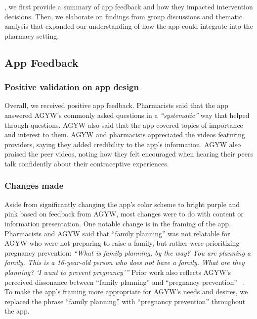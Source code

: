 , we first provide a summary of app feedback and how they impacted intervention decisions. Then, we elaborate on findings from group discussions and thematic analysis that expanded our understanding of how the  app could integrate into the pharmacy setting. 

\subsection{App Feedback}

\subsubsection{Positive validation on app design}

Overall, we received positive app feedback. Pharmacists said that the app answered AGYW’s commonly asked questions in a \textit{``systematic”} way that helped  through questions. AGYW also said that the app covered topics of importance and interest to them. AGYW and pharmacists appreciated the videos featuring providers, saying they added credibility to the app’s information. AGYW also praised the peer videos, noting how they felt encouraged when hearing their peers talk confidently about their contraceptive experiences. 

\subsubsection{Changes made}

Aside from significantly changing the app’s color scheme to bright purple and pink based on feedback from AGYW, most changes were to do with content or information presentation. One notable change is in the framing of the app. Pharmacists and AGYW said that ``family planning” was not relatable for AGYW who were not preparing to raise a family, but rather were prioritizing pregnancy prevention: \textit{``What is family planning, by the way? You are planning a family. This is a 16-year-old person who does not have a family. What are they planning? `I want to prevent pregnancy’”}  Prior work also reflects AGYW’s perceived dissonance between ``family planning” and ``pregnancy prevention” ~\cite{harrington2021spoiled}. To make the app’s framing more appropriate for AGYW’s needs and desires, we replaced the phrase ``family planning” with ``pregnancy prevention” throughout the app. 

